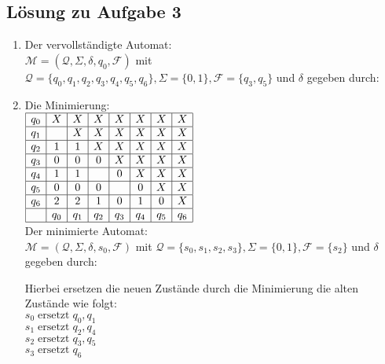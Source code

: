 \documentclass[10pt,oneside,onecolumn,a4paper,german,titlepage]{article}
\begin{document}
\subsection*{Lösung zu Aufgabe 3}
\begin{enumerate}
\item Der vervollständigte Automat:\\
$\mathcal{M} = (\mathcal{Q},\Sigma,\delta,q_0,\mathcal{F})$ mit
$\mathcal{Q} = \{q_0,q_1,q_2,q_3,q_4,q_5,q_6\}, \Sigma = \{0,1\}, \mathcal{F} =
\{q_3,q_5\}$ und $\delta$ gegeben durch:
\begin{center}
\end{center}
\item Die Minimierung:\\
$\begin{array}[t]{|c|c|c|c|c|c|c|c|}
\hline
q_0 &  X  &  X  &  X  &  X  &  X  &  X  &  X \\
\hline
q_1 &     &  X  &  X  &  X  &  X  &  X  &  X \\
\hline
q_2 &  1  &  1  &  X  &  X  &  X  &  X  &  X \\
\hline
q_3 &  0  &  0  &  0  &  X  &  X  &  X  &  X \\
\hline
q_4 &  1  &  1  &     &  0  &  X  &  X  &  X \\
\hline
q_5 &  0  &  0  &  0  &     &  0  &  X  &  X \\
\hline
q_6 &  2  &  2  &  1  &  0  &  1  &  0  &  X \\
\hline
    & q_0 & q_1 & q_2 & q_3 & q_4 & q_5 & q_6 \\
\hline
\end{array}$\\[4pt]
Der minimierte Automat:\\
$\mathcal{M} = (\mathcal{Q},\Sigma,\delta,s_0,\mathcal{F})$ mit
$\mathcal{Q} = \{s_0,s_1,s_2,s_3\}, \Sigma = \{0,1\}, \mathcal{F} = \{s_2\}$
und $\delta$ gegeben durch:
\begin{center}
\end{center}
Hierbei ersetzen die neuen Zustände durch die Minimierung die alten Zustände
wie folgt:\\
$s_0 \; \mbox{ersetzt} \; q_0,q_1$\\
$s_1 \; \mbox{ersetzt} \; q_2,q_4$\\
$s_2 \; \mbox{ersetzt} \; q_3,q_5$\\
$s_3 \; \mbox{ersetzt} \; q_6$
\end{enumerate}
\end{document}
